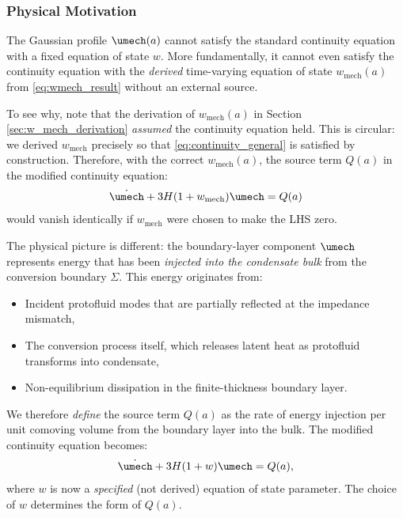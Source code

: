 \subsubsection{Physical Motivation}

The Gaussian profile $\umech(a)$ cannot satisfy the standard continuity equation with a fixed equation of state $w$. More fundamentally, it cannot even satisfy the continuity equation with the \emph{derived} time-varying equation of state $w_{\mathrm{mech}}(a)$ from \eqref{eq:wmech_result} without an external source.

To see why, note that the derivation of $w_{\mathrm{mech}}(a)$ in Section \ref{sec:w_mech_derivation} \emph{assumed} the continuity equation held. This is circular: we derived $w_{\mathrm{mech}}$ precisely so that \eqref{eq:continuity_general} is satisfied by construction. Therefore, with the correct $w_{\mathrm{mech}}(a)$, the source term $Q(a)$ in the modified continuity equation:
\begin{equation}
\label{eq:modified_continuity}
\dot{\umech} + 3H(1 + w_{\mathrm{mech}})\umech = Q(a)
\end{equation}
would vanish identically if $w_{\mathrm{mech}}$ were chosen to make the LHS zero.

The physical picture is different: the boundary-layer component $\umech$ represents energy that has been \emph{injected into the condensate bulk} from the conversion boundary $\Sigma$. This energy originates from:
\begin{itemize}
    \item Incident protofluid modes that are partially reflected at the impedance mismatch,
    \item The conversion process itself, which releases latent heat as protofluid transforms into condensate,
    \item Non-equilibrium dissipation in the finite-thickness boundary layer.
\end{itemize}

We therefore \emph{define} the source term $Q(a)$ as the rate of energy injection per unit comoving volume from the boundary layer into the bulk. The modified continuity equation becomes:
\begin{equation}
\label{eq:continuity_sourced}
\dot{\umech} + 3H(1 + w)\umech = Q(a),
\end{equation}
where $w$ is now a \emph{specified} (not derived) equation of state parameter. The choice of $w$ determines the form of $Q(a)$.

